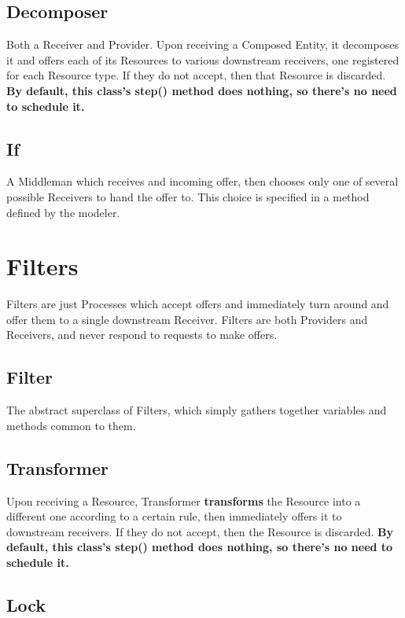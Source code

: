 \documentclass[twoside,10pt]{article}
\begin{document}
\begin{itemize}
\subsection{Decomposer}

Both a Receiver and Provider.  Upon receiving a Composed Entity, it decomposes it and offers each of its Resources to various downstream receivers, one registered for each Resource type. If they do not accept, then that Resource is discarded.  {\bf By default, this class's step() method does nothing, so there's no need to schedule it.}

\subsection{If}

A Middleman which receives and incoming offer, then chooses only one of several possible Receivers to hand the offer to.  This choice is specified in a method defined by the modeler.


\section{Filters}

Filters are just Processes which accept offers and immediately turn around and offer them to a single downstream Receiver.  Filters are both Providers and Receivers, and never respond to requests to make offers.

\subsection{Filter}

The abstract superclass of Filters, which simply gathers together variables and methods common to them.

\subsection{Transformer}

Upon receiving a Resource, Transformer {\bf transforms} the Resource into a different one according to a certain rule, then immediately offers it to downstream receivers.  If they do not accept, then the Resource is discarded.  {\bf By default, this class's step() method does nothing, so there's no need to schedule it.}

\subsection{Lock}


\end{itemize}
\end{document}

